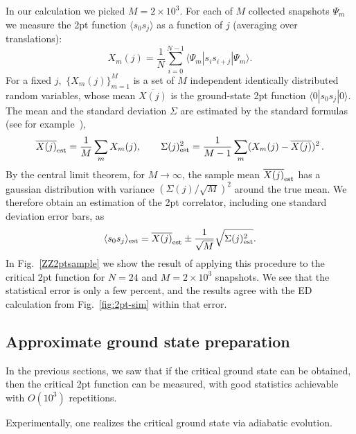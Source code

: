 \documentclass[a4paper,12pt]{article}
\theoremstyle{remark}
\theoremstyle{theorem}
\begin{document}
In our calculation we picked $M = 2 \times 10^3$. For each of $M$ collected
snapshots $\Psi_m$ we measure the 2pt function $\langle s_0 s_j
\rangle$ as a function of $j$ (averaging over translations):
\begin{equation}
	\label{sample} X_m (j) = \frac{1}{N}  \sum_{i = 0}^{N - 1} \langle \Psi_m
	|s_i s_{i + j} | \Psi_m \rangle .
\end{equation}
For a fixed $j,$ $\{ X_m (j) \}_{m = 1}^M$ is a set of $M$ independent
identically distributed random variables, whose mean $\overline{X (j)}$ is the
ground-state 2pt function $\langle 0| s_0 s_j |0 \rangle$. The mean and the
standard deviation $\Sigma$ are estimated by the standard formulas (see for example~\cite{Taylor1997ErrorAnalysis}),
\begin{equation}
	\overline{X (j)}_{\rm est} = \frac{1}{M}  \sum_m X_m (j), \qquad \Sigma
	(j)^2_{\rm est} = \frac{1}{M - 1}  \sum_m (X_m (j) - \overline{X (j)})^2
	\hspace{0.17em} .
\end{equation}
By the central limit theorem, for $M \to \infty$, the sample mean $\overline{X
	(j)}_{\rm est}$ has a gaussian distribution with variance $(\Sigma (j) /
\sqrt{M})^2$ around the true mean. We therefore obtain an estimation of the
2pt correlator, including one standard deviation error bars, as
\begin{equation}
	\langle s_0 s_j \rangle_{\rm est} = \overline{X (j)}_{\rm est} \pm
	\frac{1}{\sqrt{M}}  \sqrt{\Sigma (j)^2_{\rm est}} . \label{eq:conf}
\end{equation}
In Fig.~\ref{ZZ2ptsample} we show the result of applying this procedure to the
critical 2pt function for $N = 24$ and $M = 2 \times 10^3$ snapshots. We see
that the statistical error is only a few percent, and the results agree with the ED calculation from Fig.~\ref{fig:2pt-sim} within that error.

\subsection{Approximate ground state preparation}
\label{sec:fidelity}
In the previous sections, we saw that if the
critical ground state can be obtained, then the critical 2pt function can be
measured, with good statistics achievable with $O (10^3)$ repetitions. 

Experimentally, one realizes the critical ground state via adiabatic
evolution.
\end{document}
